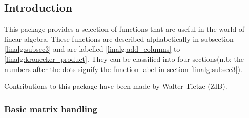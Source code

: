 

\newcommand\exprlist  {expr$_{1}$,expr$_{2}$, \ldots ,expr$_{{\tt n}}$}
\newcommand\lineqlist {lin\_eqn$_{1}$,lin\_eqn$_{2}$, \ldots ,lin\_eqn$_{n}$}
\newcommand\matlist   {mat$_{1}$,mat$_{2}$, \ldots ,mat$_{n}$}
\newcommand\veclist   {vec$_{1}$,vec$_{2}$, \ldots ,vec$_{n}$}

\newcommand\lazyfootnote{\footnote{If you're feeling lazy then the \{\}'s can 
                  be omitted.}}


\setcounter{secnumdepth}{3}


\subsection{Introduction}

This package provides a selection of functions that are useful in the world of
linear algebra. These functions are described alphabetically in subsection
\ref{linalg:subsec3} and are labelled \ref{linalg:add_columns} to
\ref{linalg:kronecker_product}.  They can be classified into four sections(n.b:
the numbers after the dots signify the function label in section
\ref{linalg:subsec3}).

Contributions to this package have been made by Walter Tietze (ZIB).

\subsubsection{Basic matrix handling}

